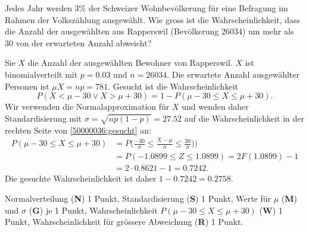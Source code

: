 Jedes Jahr werden 3\% der Schweizer Wohnbevölkerung für eine Befragung
im Rahmen der Volks\-zählung ausgewählt.
Wie gross ist die Wahrscheinlichkeit, dass die Anzahl der ausgewählten
aus Rapperswil (Bevölkerung 26034) um mehr als 30 von der erwarteten
Anzahl abweicht?


\begin{loesung}
Sie $X$ die Anzahl der ausgewählten Bewohner von Rapperswil.
$X$ ist binomialverteilt mit $p=0.03$ und $n=26034$.
Die erwartete Anzahl ausgewählter Personen ist $\mu X=np=781$.
Gesucht ist die Wahrscheinlichkeit
\begin{equation}
P(X < \mu - 30 \vee X > \mu + 30)
=
1-P(\mu - 30 \le X \le \mu + 30).
\label{50000036:gesucht}
\end{equation}
Wir verwenden die Normalapproximation für $X$ und wenden daher
Standardisierung mit $\sigma=\sqrt{np(1-p)}=27.52$ auf
die Wahrscheinlichkeit in der rechten Seite von
\eqref{50000036:gesucht}
an:
\begin{align*}
P(\mu - 30 \le X \le \mu + 30)
&=
P\biggl(
\frac{-30}{\sigma} \le \frac{X-\mu}{\sigma} \le \frac{30}{\sigma})
\biggr)
\\
&=
P(-1.0899 \le Z \le 1.0899)
=
2F(1.0899)-1
\\
&=
2\cdot 0.8621 - 1
=
0.7242.
\end{align*}
Die gesuchte Wahrscheinlichkeit ist daher $1-0.7242= 0.2758$.
\end{loesung}

\begin{bewertung}
Normalverteilung ({\bf N}) 1 Punkt,
Standardisierung ({\bf S}) 1 Punkt,
Werte für $\mu$ ({\bf M}) und $\sigma$ ({\bf G}) je 1 Punkt,
Wahrscheinlichkeit $P(\mu-30\le X\le \mu+30)$ ({\bf W}) 1 Punkt,
Wahrscheinlichkeit für grössere Abweichung ({\bf R}) 1 Punkt.
\end{bewertung}
